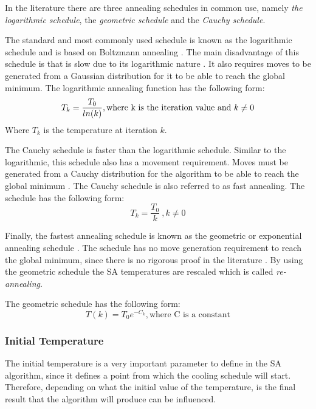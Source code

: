 In the literature there are three annealing schedules in common use, namely \emph{the logarithmic schedule}, the \emph{geometric schedule} and the \emph{Cauchy schedule}\cite{VeryFastSAImageEnchancement,SASingleMultiObj}. 

The standard and most commonly used schedule is known as the logarithmic schedule and is based on Boltzmann annealing \cite{VeryFastSAImageEnchancement}. The main disadvantage of this schedule is that is slow due to its logarithmic nature \cite{VeryFastSAImageEnchancement}. It also requires moves to be generated from a Gaussian distribution for it to be able to reach the global minimum\cite{SASingleMultiObj}. The logarithmic annealing function has the following form:
\begin{equation}
\label{eq:logcooling}
	T_k = \frac{T_0}{ln(k)},\text{where k is the iteration value and } k \neq 0\\
\end{equation}
Where $T_k$ is the temperature at iteration $k$.

The Cauchy schedule is faster than the logarithmic schedule. Similar to the logarithmic, this schedule also has a movement requirement. Moves must be generated from a Cauchy distribution for the algorithm to be able to reach the global minimum \cite{SASingleMultiObj,VeryFastSAImageEnchancement}. The Cauchy schedule is also referred to as fast annealing\cite{VeryFastSAImageEnchancement}. The schedule has the following form:
\begin{equation}
\label{eq:cauchycooling}
	T_k = \frac{T_0}{k} ~, k \neq 0
\end{equation}

Finally, the fastest annealing schedule is known as the geometric or exponential annealing schedule \cite{SASingleMultiObj}. The schedule has no move generation requirement to reach the global minimum, since there is no rigorous proof in the literature \cite{SASingleMultiObj}. By using the geometric schedule the \gls{SA} temperatures are rescaled which is called \emph{re-annealing}\cite{VeryFastSAImageEnchancement}.

The geometric schedule has the following form:
\begin{equation}
\label{eq:geocooling}
	T(k)=T_0e^{-C_k},\text{where C is a constant}
\end{equation}

\subsubsection{Initial Temperature}
The initial temperature is a very important parameter to define in the \gls{SA} algorithm, since it defines a point from which the cooling schedule will start\cite{VariousCoolingSA}. Therefore, depending on what the initial value of the temperature, is the final result that the algorithm will produce can be influenced\cite{SALongestCommon,AutoConfigSA}.


